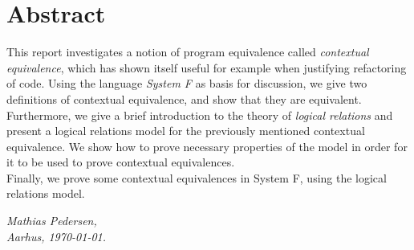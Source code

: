 \documentclass[a4paper, 11pt]{report}
\theoremstyle{definition}
\begin{document}

\pagestyle{empty} 
\vspace*{\fill}
\clearpage
\linespread{1.15}


\pagestyle{plain}
\chapter*{Abstract}

This report investigates a notion of program equivalence called \textit{contextual equivalence}, which has shown itself useful for example when justifying refactoring of code. Using the language \textit{System F} as basis for discussion, we give two definitions of contextual equivalence, and show that they are equivalent.\\
Furthermore, we give a brief introduction to the theory of \textit{logical relations} and present a logical relations model for the previously mentioned contextual equivalence. We show how to prove necessary properties of the model in order for it to be used to prove contextual equivalences.\\
Finally, we prove some contextual equivalences in System F, using the logical relations model.

\vspace{2ex}
\begin{flushright}
  \emph{Mathias Pedersen,}\\
  \emph{Aarhus, \today.}
\end{flushright}
\end{document}
